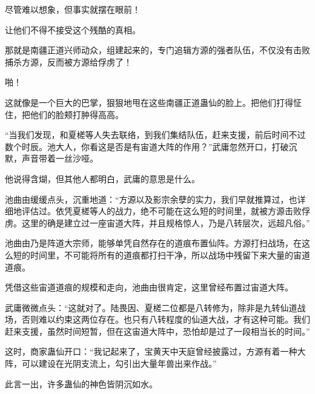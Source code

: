 \begin{this_body}
尽管难以想象，但事实就摆在眼前！

让他们不得不接受这个残酷的真相。

那就是南疆正道兴师动众，组建起来的，专门追辑方源的强者队伍，不仅没有击败捕杀方源，反而被方源给俘虏了！

啪！

这就像是一个巨大的巴掌，狠狠地甩在这些南疆正道蛊仙的脸上。把他们打得怔住，把他们的脸颊打肿得高高。

“当我们发现，和夏槎等人失去联络，到我们集结队伍，赶来支援，前后时间不过数个时辰。池大人，你看这是否是有宙道大阵的作用？”武庸忽然开口，打破沉默，声音带着一丝沙哑。

他说得含煳，但其他人都明白，武庸的意思是什么。

池曲由缓缓点头，沉重地道：“方源以及影宗余孽的实力，我们早就推算过，也详细地评估过。依凭夏槎等人的战力，绝不可能在这么短的时间里，就被方源击败俘虏。这里的确是建立过一座宙道大阵，并且规格惊人，乃是八转层次，远超凡俗。”

池曲由乃是阵道大宗师，能够单凭自然存在的道痕布置仙阵。方源打扫战场，在这么短的时间里，不可能将所有的道痕都打扫干净，所以战场中残留下来大量的宙道道痕。

凭借这些宙道道痕的规模和走向，池曲由很肯定，这里曾经布置过宙道大阵。

武庸微微点头：“这就对了。陆畏因、夏槎二位都是八转修为，除非是九转仙道战场，否则难以约束这两位存在。也只有八转程度的仙道大战，才有这种可能。我们赶来支援，虽然时间短暂，但在这宙道大阵中，恐怕却是过了一段相当长的时间。”

这时，商家蛊仙开口：“我记起来了，宝黄天中天庭曾经披露过，方源有着一种大阵，可以建设在光阴支流上，勾引出大量年兽出来作战。”

此言一出，许多蛊仙的神色皆阴沉如水。

\end{this_body}

